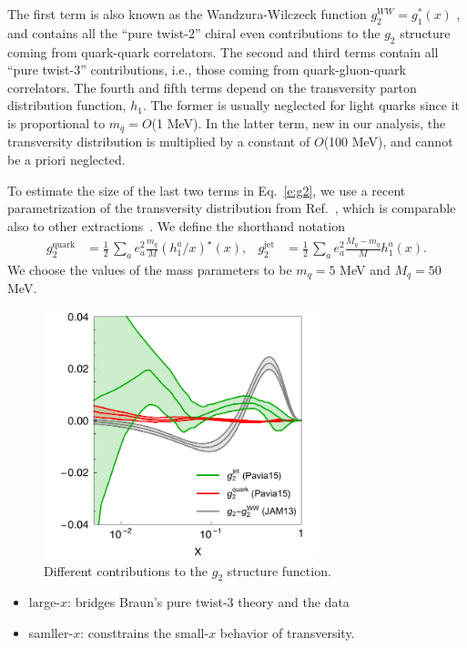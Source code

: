 \documentclass[preprintnumbers,floatfix,nofootinbib]{revtex4}
\newcommand{\mj}{M_q}
\begin{document}
The first term is also known as the Wandzura-Wilczeck function $g_2^{WW} =
g_1^*(x)$ , and contains all the ``pure twist-2'' chiral even contributions to
the $g_2$ structure coming from quark-quark correlators. The second and third
terms contain all ``pure twist-3'' contributions, i.e., those coming from
quark-gluon-quark correlators. The fourth and fifth terms depend on the
transversity parton distribution function, $h_1$. 
The former is usually neglected for
light quarks since it is proportional to $m_q=O$(1 MeV). In the latter term,
new in our analysis, the transversity distribution is multiplied by a constant
of $O$(100 MeV), and cannot be a priori neglected.

To estimate the size of the last two terms in Eq.~\eqref{e:g2}, 
we use a recent parametrization of the transversity distribution from
Ref.~\cite{Radici:2015mwa}, which is comparable also to other
extractions~\cite{Anselmino:2013vqa,Kang:2015msa}. We define the shorthand
notation
\begin{align}
g_2^{\text{quark}} &= \frac{1}{2}\,\sum_a e_a^2 
 \frac{m_q}{M} (h_1^a/x)^\star(x),
&
g_2^{\text{jet}} &= \frac{1}{2}\,\sum_a e_a^2 
\frac{\mj-m_q}{M} h_1^a(x). 
\end{align} 
We choose the values of the mass parameters to be $m_q=5$ MeV and 
$\mj = 50$ MeV.

\begin{figure}[ht]
\begin{center}
\includegraphics[width=8cm]{g2contrib}
\caption{\label{f:g2contrib} 
Different contributions to the $g_2$ structure function. 
}
\end{center}
\end{figure}

\begin{itemize}
\item large-$x$: bridges Braun's pure twist-3 theory and the data
\item samller-$x$: consttrains the small-$x$ behavior of transversity.
\end{itemize}
\end{document}
